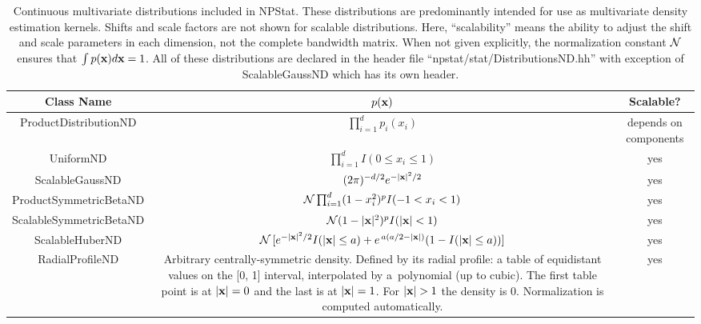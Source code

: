 \documentclass[12pt,titlepage]{article}
\newcommand{\cname}[1]{\index{#1}\textsf{#1}}
\begin{document}
\begin{table}[ht!]
\caption{Continuous multivariate distributions included in NPStat.
These distributions are predominantly intended for use as multivariate
density estimation kernels.
Shifts and scale factors are not shown for scalable distributions.
Here, ``scalability'' means
the ability to adjust the shift and scale parameters in each
dimension, not the complete bandwidth matrix.
When not given explicitly, the normalization constant $\cal{N}$
ensures that 
$\int p({\bf x}) d{\bf x} = 1$. All of these distributions
are declared in the header file ``npstat/stat/DistributionsND.hh''
with exception of \cname{ScalableGaussND} which has its own header.}
\label{table:distrosnd}
\begin{center}
\noindent\begin{tabular}{|c|c|c|} \hline
Class Name & $p({\bf x})$ & Scalable? \\ \hline\hline
\cname{ProductDistributionND} &  $\prod_{i=1}^{d} p_i(x_i)$ & 
\begin{minipage}{0.13\linewidth}
depends on components
\end{minipage} \\ \hline
\cname{UniformND} & $\prod_{i=1}^{d} I(0 \le x_i \le 1)$ & yes \\ \hline
\cname{ScalableGaussND} & $(2 \pi)^{-d/2} e^{-|{\bf x}|^2/2}$ & yes \\ \hline
\cname{ProductSymmetricBetaND} & ${\cal{N}} \prod_{i=1}^{d} (1 - x_i^2)^p I(-1 < x_i < 1)$ & yes \\ \hline
\cname{ScalableSymmetricBetaND} & ${\cal{N}} (1 - |{\bf x}|^2)^p I(|{\bf x}| < 1)$ & yes \\ \hline
\cname{ScalableHuberND} & ${\cal{N}} \, [e^{-|{\bf x}|^2/2} I(|{\bf x}| \le a) + e^{\, a (a/2 - |{\bf x}|)} (1 - I(|{\bf x}| \le a))]$ & yes \\ \hline
\cname{RadialProfileND} & \begin{minipage}{0.52\linewidth}
                      \vskip1mm
                      Arbitrary centrally-symmetric density.
                      Defined by its radial profile:
                      a table of equidistant values on
                      the [0, 1] interval, interpolated by 
                      a~polynomial (up to cubic). The first table
                      point is at $|{\bf x}| = 0$ and the last is at
                      $|{\bf x}| = 1$. For $|{\bf x}| > 1$ the density is 0.
                      Normalization is computed automatically.
                      \end{minipage} & yes \\ \hline

\end{tabular}
\end{center}
\end{table}
\end{document}
